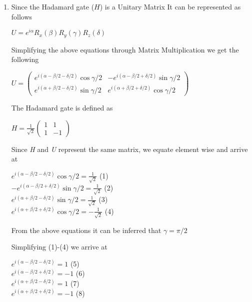 \documentclass[a4paper,12pt]{article}
\begin{document}
\begin{enumerate}[label=(\alph*)]
    \item
          Since the Hadamard gate ($H$) is a Unitary Matrix
          It can be represented as follows

          $U = e^{i\alpha}R_{x}(\beta)R_{y}(\gamma)R_{z}(\delta)$

          Simplifying the above equations through Matrix Multiplication we get the following

          $U = \begin{pmatrix}
                  e^{i(\alpha - \beta / 2 - \delta /  2)}\cos{\gamma / 2} & -e^{i(\alpha - \beta / 2 + \delta /  2)}\sin{\gamma / 2} \\
                  e^{i(\alpha + \beta / 2 - \delta /  2)}\sin{\gamma / 2} & e^{i(\alpha + \beta / 2 + \delta /  2)}\cos{\gamma / 2}
              \end{pmatrix}$

          The Hadamard gate is defined as

          $H = \frac{1}{\sqrt{2}}
              \begin{pmatrix}
                  1 & 1  \\
                  1 & -1
              \end{pmatrix}$

          Since \emph{H} and \emph{U} represent the same matrix, we equate element wise and arrive at

          $e^{i(\alpha - \beta / 2 - \delta /  2)}\cos{\gamma / 2} = \frac{1}{\sqrt{2}}$ \hfill(1)\\
          $-e^{i(\alpha - \beta / 2 + \delta /  2)}\sin{\gamma / 2} = \frac{1}{\sqrt{2}}$ \hfill(2)\\
          $e^{i(\alpha + \beta / 2 - \delta /  2)}\sin{\gamma / 2} = \frac{1}{\sqrt{2}}$ \hfill(3)\\
          $e^{i(\alpha + \beta / 2 + \delta /  2)}\cos{\gamma / 2} = -\frac{1}{\sqrt{2}}$ \hfill(4)

          From the above equations it can be inferred that $\gamma = \pi / 2$

          Simplifying (1)-(4) we arrive at

          $e^{i(\alpha - \beta / 2 - \delta /  2)} = 1$ \hfill(5)\\
          $e^{i(\alpha - \beta / 2 + \delta /  2)} = -1$ \hfill(6)\\
          $e^{i(\alpha + \beta / 2 - \delta /  2)} = 1$ \hfill(7)\\
          $e^{i(\alpha + \beta / 2 + \delta /  2)} = -1$ \hfill(8)


\end{enumerate}
\end{document}
